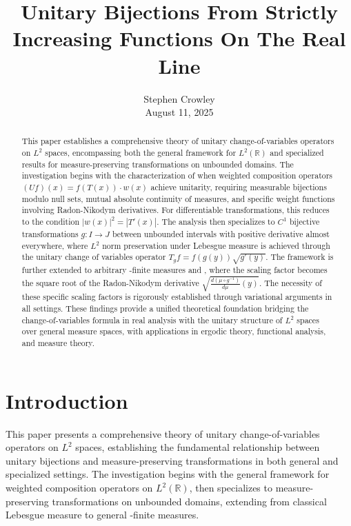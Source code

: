 \documentclass{article}
\newcommand{\tmaffiliation}[1]{\\ #1}
\begin{document}
{\cdot}\title{Unitary Bijections From Strictly Increasing Functions On The
Real Line}

\author{
  Stephen Crowley
  \tmaffiliation{August 11, 2025}
}

\maketitle

\begin{abstract}
  This paper establishes a comprehensive theory of unitary change-of-variables
  operators on $L^2$ spaces, encompassing both the general framework for $L^2
  (\mathbb{R})$ and specialized results for measure-preserving transformations
  on unbounded domains. The investigation begins with the characterization of
  when weighted composition operators $(Uf) (x) = f (T (x)) \cdot w (x)$
  achieve unitarity, requiring measurable bijections modulo null sets, mutual
  absolute continuity of measures, and specific weight functions involving
  Radon-Nikodym derivatives. For differentiable transformations, this reduces
  to the condition $|w (x) |^2 = |T' (x) |$. The analysis then specializes to
  $C^1$ bijective transformations $g : I \to J$ between unbounded intervals
  with positive derivative almost everywhere, where $L^2$ norm preservation
  under Lebesgue measure is achieved through the unitary change of variables
  operator $T_g f = f (g (y)) \sqrt{g' (y)}$. The framework is further
  extended to arbitrary {\sigma}-finite measures {\textmu} and {\nu}, where
  the scaling factor becomes the square root of the Radon-Nikodym derivative
  $\sqrt{\frac{d (\mu \circ g^{- 1})}{d \mu} (y)}$. The necessity of these
  specific scaling factors is rigorously established through variational
  arguments in all settings. These findings provide a unified theoretical
  foundation bridging the change-of-variables formula in real analysis with
  the unitary structure of $L^2$ spaces over general measure spaces, with
  applications in ergodic theory, functional analysis, and measure theory.
\end{abstract}

{\tableofcontents}

\section{Introduction}

This paper presents a comprehensive theory of unitary change-of-variables
operators on $L^2$ spaces, establishing the fundamental relationship between
unitary bijections and measure-preserving transformations in both general and
specialized settings. The investigation begins with the general framework for
weighted composition operators on $L^2 (\mathbb{R})$, then specializes to
measure-preserving transformations on unbounded domains, extending from
classical Lebesgue measure to general {\sigma}-finite measures.
\end{document}
